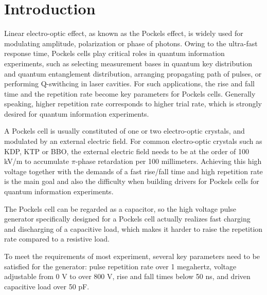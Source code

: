 \documentclass[aip,rsi,reprint,graphicx]{revtex4-1} %
\begin{document}
\section{Introduction}
Linear electro-optic effect, as known as the Pockels effect, is widely used for modulating amplitude, polarization or phase of photons. Owing to the ultra-fast response time, Pockels cells play critical roles in quantum information experiments,
 such as selecting measurement bases in quantum key distribution and quantum entanglement distribution\cite{yin2017satellite,giustina2015significant,shalm2015strong},
 arranging propagating path of pulses\cite{li2016experimental,wang2017high},
 or performing Q-swithcing in laser cavities\cite{kwiat1995interaction}.
 For such applications, the rise and fall time and the repetition rate become key parameters for Pockels cells.
 Generally speaking, higher repetition rate corresponds to higher trial rate, which is strongly desired for quantum information experiments.

A Pockels cell is usually constituted of one or two electro-optic crystals, and modulated by an external electric field. For common electro-optic crystals such as KDP, KTP or BBO, the external electric field needs to be at the order of 100 kV/m to accumulate $\pi$-phase retardation per 100 millimeters.
Achieving this high voltage together with the demands of a fast rise/fall time and high repetition rate is the main goal and also the difficulty when building drivers for Pockels cells for quantum information experiments.

The Pockels cell can be regarded as a capacitor, so the high voltage pulse generator specifically designed for a Pockels cell actually realizes fast charging and discharging of a capacitive load, which makes it harder to raise the repetition rate compared to a resistive load.

To meet the requirements of most experiment, several key parameters need to be satisfied for the generator: pulse repetition rate over 1 megahertz, voltage adjustable from 0 V to over 800 V, rise and fall times below 50 ns, and driven capacitive load over 50 pF.
\end{document}

